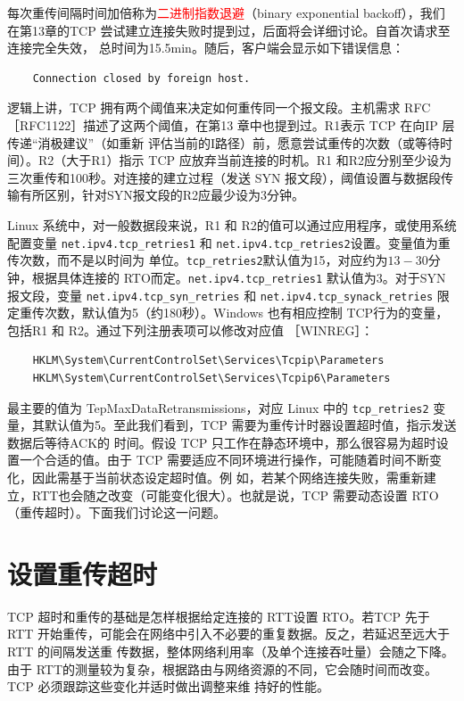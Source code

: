 每次重传间隔时间加倍称为\textcolor{red}{二进制指数退避}（binary exponential backoff），我们在第13章的TCP 尝试建立连接失败时提到过，后面将会详细讨论。自首次请求至连接完全失效，
总时间为15.5min。随后，客户端会显示如下错误信息：
\begin{verbatim}
    Connection closed by foreign host.
\end{verbatim}

逻辑上讲，TCP 拥有两个阈值来决定如何重传同一个报文段。主机需求 RFC［RFC1122］描述了这两个阈值，在第13 章中也提到过。R1表示 TCP 在向IP 层传递“消极建议”（如重新
评估当前的I路径）前，愿意尝试重传的次数（或等待时间）。R2（大于R1）指示 TCP 应放弃当前连接的时机。R1 和R2应分别至少设为三次重传和100秒。对连接的建立过程（发送
SYN 报文段），阈值设置与数据段传输有所区别，针对SYN报文段的R2应最少设为3分钟。

Linux 系统中，对一般数据段来说，R1 和 R2的值可以通过应用程序，或使用系统配置变量 \verb|net.ipv4.tcp_retries1| 和 \verb|net.ipv4.tcp_retries2|设置。变量值为重传次数，而不是以时间为
单位。\verb|tcp_retries2|默认值为15，对应约为\(13-30\)分钟，根据具体连接的 RTO而定。\verb|net.ipv4.tcp_retries1| 默认值为3。对于SYN报文段，变量 \verb|net.ipv4.tcp_syn_retries|
和 \verb|net.ipv4.tcp_synack_retries| 限定重传次数，默认值为5（约180秒）。Windows 也有相应控制 TCP行为的变量，包括R1 和 R2。通过下列注册表项可以修改对应值 ［WINREG］：

\begin{verbatim}
    HKLM\System\CurrentControlSet\Services\Tcpip\Parameters
    HKLM\System\CurrentControlSet\Services\Tcpip6\Parameters
\end{verbatim}

最主要的值为 TepMaxDataRetransmissions，对应 Linux 中的 \verb|tcp_retries2| 变量，其默认值为5。至此我们看到，TCP 需要为重传计时器设置超时值，指示发送数据后等待ACK的
时间。假设 TCP 只工作在静态环境中，那么很容易为超时设置一个合适的值。由于 TCP 需要适应不同环境进行操作，可能随着时间不断变化，因此需基于当前状态设定超时值。例
如，若某个网络连接失败，需重新建立，RTT也会随之改变（可能变化很大）。也就是说，TCP 需要动态设置 RTO（重传超时）。下面我们讨论这一问题。

\section{设置重传超时}
TCP 超时和重传的基础是怎样根据给定连接的 RTT设置 RTO。若TCP 先于 RTT 开始重传，可能会在网络中引入不必要的重复数据。反之，若延迟至远大于 RTT 的间隔发送重
传数据，整体网络利用率（及单个连接吞吐量）会随之下降。由于 RTT的测量较为复杂，根据路由与网络资源的不同，它会随时间而改变。TCP 必须跟踪这些变化并适时做出调整来维
持好的性能。


